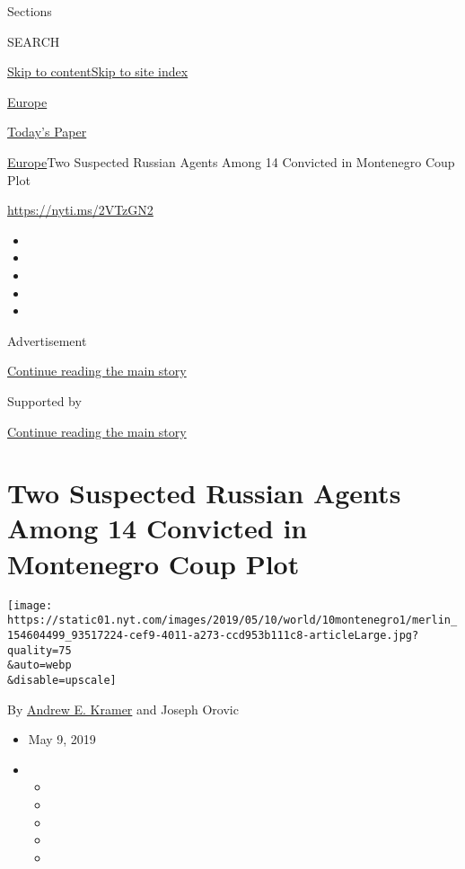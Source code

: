 Sections

SEARCH

\protect\hyperlink{site-content}{Skip to
content}\protect\hyperlink{site-index}{Skip to site index}

\href{https://www.nytimes.com/section/world/europe}{Europe}

\href{https://myaccount.nytimes.com/auth/login?response_type=cookie\&client_id=vi}{}

\href{https://www.nytimes.com/section/todayspaper}{Today's Paper}

\href{/section/world/europe}{Europe}\textbar{}Two Suspected Russian
Agents Among 14 Convicted in Montenegro Coup Plot

\url{https://nyti.ms/2VTzGN2}

\begin{itemize}
\item
\item
\item
\item
\item
\end{itemize}

Advertisement

\protect\hyperlink{after-top}{Continue reading the main story}

Supported by

\protect\hyperlink{after-sponsor}{Continue reading the main story}

\hypertarget{two-suspected-russian-agents-among-14-convicted-in-montenegro-coup-plot}{%
\section{Two Suspected Russian Agents Among 14 Convicted in Montenegro
Coup
Plot}\label{two-suspected-russian-agents-among-14-convicted-in-montenegro-coup-plot}}

\texttt{[image: https://static01.nyt.com/images/2019/05/10/world/10montenegro1/merlin\_154604499\_93517224-cef9-4011-a273-ccd953b111c8-articleLarge.jpg?quality=75\\\&auto=webp\\\&disable=upscale]}

By \href{https://www.nytimes.com/by/andrew-e-kramer}{Andrew E. Kramer}
and Joseph Orovic

\begin{itemize}
\item
  May 9, 2019
\item
  \begin{itemize}
  \item
  \item
  \item
  \item
  \item
  \end{itemize}
\end{itemize}

